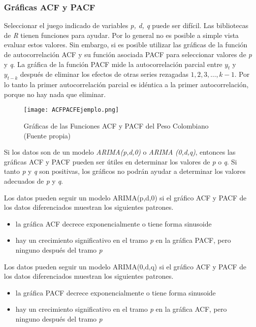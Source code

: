 \subsubsection{Gráficas ACF y PACF}
Seleccionar el juego indicado de variables \emph{p, d, q} puede ser difícil. Las bibliotecas de \emph{R} tienen funciones para ayudar. Por lo general no es posible a simple vista evaluar estos valores. Sin embargo, si es posible utilizar las gráficas de la función de autocorrelación ACF y su función asociada PACF para seleccionar valores de \textit{p} y \textit{q}. La gráfica de la función PACF mide la autocorrelación parcial entre $y_{t}$ y $y_{t-k}$ después de eliminar los efectos de otras series rezagadas $1, 2, 3, \ldots, k-1$. Por lo tanto la primer autocorrelación parcial es idéntica a la primer autocorrelación, porque no hay nada que eliminar.

\begin{figure}[h!]
    \centering
    \texttt{[image: ACFPACFEjemplo.png]}
    \caption{Gráficas de las Funciones ACF y PACF del Peso Colombiano (Fuente propia)}
\end{figure}

Si los datos son de un modelo \textit{ARIMA(p,d,0)} o \textit{ARIMA (0,d,q)}, entonces las gráficas ACF y PACF pueden ser útiles en determinar los valores de \emph{p} o \emph{q}. Si tanto \emph{p} y \emph{q} son positivas, los gráficos no podrán ayudar a determinar los valores adecuados de \emph{p} y \emph{q}.

Los datos pueden seguir un modelo ARIMA(p,d,0) si el gráfico ACF y PACF de los datos diferenciados muestran los siguientes patrones.
\begin{itemize}
	\item la gráfica ACF decrece exponencialmente o tiene forma sinusoide
	\item hay un crecimiento significativo en el tramo \textit{p} en la gráfica PACF, pero ninguno después del tramo \textit{p}
\end{itemize}

Los datos pueden seguir un modelo ARIMA(0,d,q) si el gráfico ACF y PACF de los datos diferenciados muestran los siguientes patrones.
\begin{itemize}
	\item la gráfica PACF decrece exponencialmente o tiene forma sinusoide
	\item hay un crecimiento significativo en el tramo \textit{p} en la gráfica ACF, pero ninguno después del tramo \textit{p}
\end{itemize}
